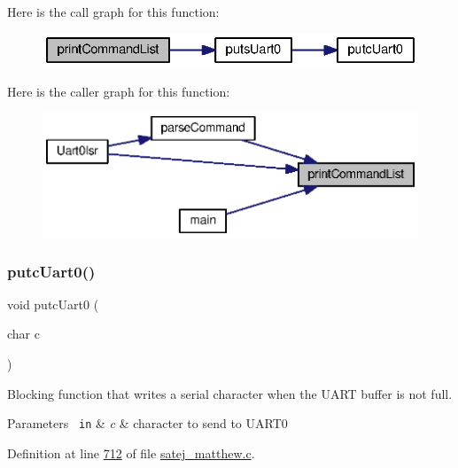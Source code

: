 Here is the call graph for this function\+:
\nopagebreak
\begin{figure}[H]
\begin{center}
\leavevmode
\includegraphics[width=329pt]{satej__matthew_8c_a9657c6b2d1c183503ca49b71da13e9e4_cgraph}
\end{center}
\end{figure}
Here is the caller graph for this function\+:
\nopagebreak
\begin{figure}[H]
\begin{center}
\leavevmode
\includegraphics[width=346pt]{satej__matthew_8c_a9657c6b2d1c183503ca49b71da13e9e4_icgraph}
\end{center}
\end{figure}
\mbox{\label{satej__matthew_8c_a27ebab6950bfb65d641dd04feb03906f}} 
\subsubsection{\texorpdfstring{putcUart0()}{putcUart0()}}
{\footnotesize\ttfamily void putc\+Uart0 (\begin{DoxyParamCaption}\item[{char}]{c }\end{DoxyParamCaption})}



Blocking function that writes a serial character when the U\+A\+RT buffer is not full. 


\begin{DoxyParams}[1]{Parameters}
\mbox{\texttt{ in}}  & {\em c} & character to send to U\+A\+R\+T0 \\
\hline
\end{DoxyParams}


Definition at line \mbox{\hyperlink{satej__matthew_8c_source_l00712}{712}} of file \mbox{\hyperlink{satej__matthew_8c_source}{satej\+\_\+matthew.\+c}}.

